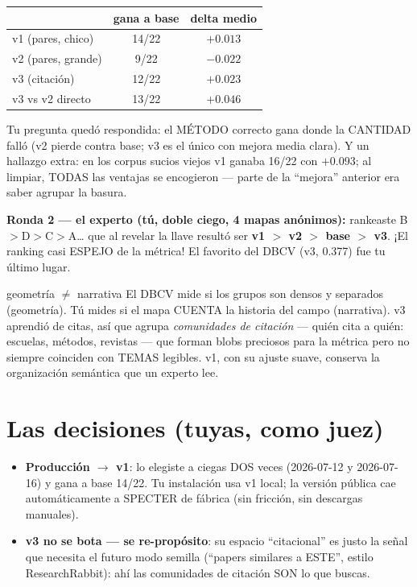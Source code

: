 \documentclass[11pt,a4paper]{article}
\begin{document}
\begin{center}
\begin{tabular}{lcc}
 & gana a base & delta medio \\
\hline
v1 (pares, chico)   & 14/22 & $+0.013$ \\
v2 (pares, grande)  & 9/22  & $-0.022$ \\
v3 (citación)       & 12/22 & $\mathbf{+0.023}$ \\
v3 vs v2 directo    & 13/22 & $+0.046$ \\
\end{tabular}
\end{center}

Tu pregunta quedó respondida: el MÉTODO correcto gana donde la CANTIDAD falló (v2 pierde
contra base; v3 es el único con mejora media clara). Y un hallazgo extra: en los corpus
sucios viejos v1 ganaba 16/22 con $+0.093$; al limpiar, TODAS las ventajas se encogieron
--- parte de la ``mejora'' anterior era saber agrupar la basura.

\textbf{Ronda 2 --- el experto (tú, doble ciego, 4 mapas anónimos):} rankeaste
B$>$D$>$C$>$A\ldots{} que al revelar la llave resultó ser \textbf{v1 $>$ v2 $>$ base $>$
v3}. ¡El ranking casi ESPEJO de la métrica! El favorito del DBCV (v3, 0.377) fue tu
último lugar.

\begin{concepto}{geometría $\neq$ narrativa}
El DBCV mide si los grupos son densos y separados (geometría). Tú mides si el mapa
CUENTA la historia del campo (narrativa). v3 aprendió de citas, así que agrupa
\emph{comunidades de citación} --- quién cita a quién: escuelas, métodos, revistas ---
que forman blobs preciosos para la métrica pero no siempre coinciden con TEMAS legibles.
v1, con su ajuste suave, conserva la organización semántica que un experto lee.
\end{concepto}

\section{Las decisiones (tuyas, como juez)}

\begin{itemize}
  \item \textbf{Producción $\to$ v1}: lo elegiste a ciegas DOS veces (2026-07-12 y
        2026-07-16) y gana a base 14/22. Tu instalación usa v1 local; la versión pública
        cae automáticamente a SPECTER de fábrica (sin fricción, sin descargas manuales).
  \item \textbf{v3 no se bota --- se re-propósito}: su espacio ``citacional'' es justo la
        señal que necesita el futuro modo semilla (``papers similares a ESTE'', estilo
        ResearchRabbit): ahí las comunidades de citación SON lo que buscas.
\end{itemize}
\end{document}
